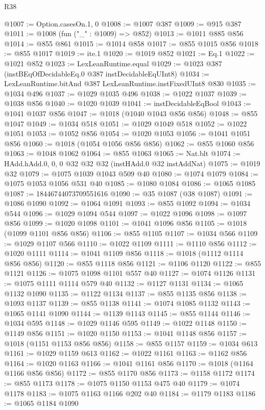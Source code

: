 \begin{lexlean}{R38}
\begin{coremodule}
@1007 := Option.casesOn.{1, 0}
@1008 := @1007 @387
@1009 := @915 @387
@1011 := @1008 (fun ("_" : @1009) => @852)
@1013 := @1011 @885 @856
@1014 := @855 @861
@1015 := @1014 @858
@1017 := @855 @1015 @856
@1018 := @855 @1017
@1019 := ite.{1}
@1020 := @1019 @852
@1021 := Eq.{1}
@1022 := @1021 @852
@1023 := LexLeanRuntime.equal
@1029 := @1023 @387 (instBEqOfDecidableEq.{0} @387 instDecidableEqUInt8)
@1034 := LexLeanRuntime.bitAnd @387 LexLeanRuntime.instFixedUInt8 @830
@1035 := @1034 @496
@1037 := @1029 @1035 @496
@1038 := @1022 @1037
@1039 := @1038 @856
@1040 := @1020 @1039
@1041 := instDecidableEqBool
@1043 := @1041 @1037 @856
@1047 := @1018 (@1040 @1043 @856 @856)
@1048 := @855 @1047
@1049 := @1034 @518
@1051 := @1029 @1049 @518
@1052 := @1022 @1051
@1053 := @1052 @856
@1054 := @1020 @1053
@1056 := @1041 @1051 @856
@1060 := @1018 (@1054 @1056 @856 @856)
@1062 := @855 @1060 @856
@1063 := @1048 @1062
@1064 := @855 @1063
@1065 := Nat.blt
@1074 := HAdd.hAdd.{0, 0, 0} @32 @32 @32 (instHAdd.{0} @32 instAddNat)
@1075 := @1019 @32
@1079 := @1075 @1039 @1043 @509 @40
@1080 := @1074 @1079
@1084 := @1075 @1053 @1056 @531 @40
@1085 := @1080 @1084
@1086 := @1065 @1085
@1087 := 18446744073709551616
@1090 := @35 @1087 (@38 @1087)
@1091 := @1086 @1090
@1092 := @1064 @1091
@1093 := @855 @1092
@1094 := @1034 @544
@1096 := @1029 @1094 @544
@1097 := @1022 @1096
@1098 := @1097 @856
@1099 := @1020 @1098
@1101 := @1041 @1096 @856
@1105 := @1018 (@1099 @1101 @856 @856)
@1106 := @855 @1105
@1107 := @1034 @566
@1109 := @1029 @1107 @566
@1110 := @1022 @1109
@1111 := @1110 @856
@1112 := @1020 @1111
@1114 := @1041 @1109 @856
@1118 := @1018 (@1112 @1114 @856 @856)
@1120 := @855 @1118 @856
@1121 := @1106 @1120
@1122 := @855 @1121
@1126 := @1075 @1098 @1101 @557 @40
@1127 := @1074 @1126
@1131 := @1075 @1111 @1114 @579 @40
@1132 := @1127 @1131
@1134 := @1065 @1132 @1090
@1135 := @1122 @1134
@1137 := @855 @1135 @856
@1138 := @1093 @1137
@1139 := @855 @1138
@1141 := @1074 @1085 @1132
@1143 := @1065 @1141 @1090
@1144 := @1139 @1143
@1145 := @855 @1144
@1146 := @1034 @595
@1148 := @1029 @1146 @595
@1149 := @1022 @1148
@1150 := @1149 @856
@1151 := @1020 @1150
@1153 := @1041 @1148 @856
@1157 := @1018 (@1151 @1153 @856 @856)
@1158 := @855 @1157
@1159 := @1034 @613
@1161 := @1029 @1159 @613
@1162 := @1022 @1161
@1163 := @1162 @856
@1164 := @1020 @1163
@1166 := @1041 @1161 @856
@1170 := @1018 (@1164 @1166 @856 @856)
@1172 := @855 @1170 @856
@1173 := @1158 @1172
@1174 := @855 @1173
@1178 := @1075 @1150 @1153 @475 @40
@1179 := @1074 @1178
@1183 := @1075 @1163 @1166 @202 @40
@1184 := @1179 @1183
@1186 := @1065 @1184 @1090

\end{coremodule}
\end{lexlean}
